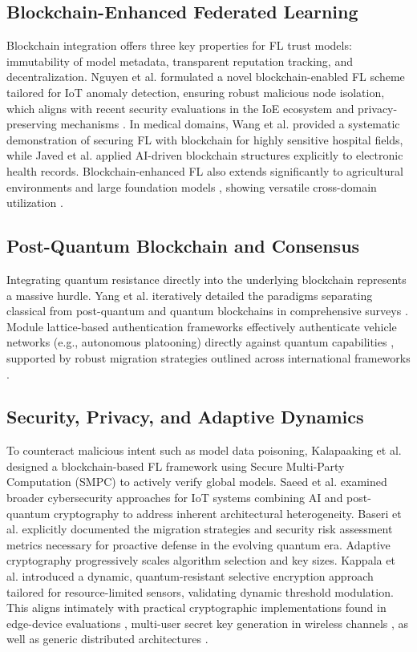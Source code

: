 \documentclass[journal, 10pt, twocolumn]{IEEEtran}
\begin{document}
\subsection{Blockchain-Enhanced Federated Learning}
Blockchain integration offers three key properties for FL trust models: immutability of model metadata, transparent reputation tracking, and decentralization. Nguyen et al. \cite{nguyen2025} formulated a novel blockchain-enabled FL scheme tailored for IoT anomaly detection, ensuring robust malicious node isolation, which aligns with recent security evaluations in the IoE ecosystem \cite{eren2025} and privacy-preserving mechanisms \cite{sameera2024, moore2024}. In medical domains, Wang et al. \cite{wang2026} provided a systematic demonstration of securing FL with blockchain for highly sensitive hospital fields, while Javed et al. \cite{javed2025} applied AI-driven blockchain structures explicitly to electronic health records. Blockchain-enhanced FL also extends significantly to agricultural environments \cite{marzougui2025} and large foundation models \cite{rong2025}, showing versatile cross-domain utilization \cite{anon_crdownload}.

\subsection{Post-Quantum Blockchain and Consensus}
Integrating quantum resistance directly into the underlying blockchain represents a massive hurdle. Yang et al. iteratively detailed the paradigms separating classical from post-quantum and quantum blockchains in comprehensive surveys \cite{yang2024_survey1, yang2024_survey2}. Module lattice-based authentication frameworks effectively authenticate vehicle networks (e.g., autonomous platooning) directly against quantum capabilities \cite{chaudhary2024}, supported by robust migration strategies outlined across international frameworks \cite{elbizri2026}.

\subsection{Security, Privacy, and Adaptive Dynamics}
To counteract malicious intent such as model data poisoning, Kalapaaking et al. \cite{kalapaaking2023} designed a blockchain-based FL framework using Secure Multi-Party Computation (SMPC) to actively verify global models. Saeed et al. \cite{saeed2024} examined broader cybersecurity approaches for IoT systems combining AI and post-quantum cryptography to address inherent architectural heterogeneity. Baseri et al. \cite{baseri2025} explicitly documented the migration strategies and security risk assessment metrics necessary for proactive defense in the evolving quantum era. Adaptive cryptography progressively scales algorithm selection and key sizes. Kappala et al. \cite{kappala2026} introduced a dynamic, quantum-resistant selective encryption approach tailored for resource-limited sensors, validating dynamic threshold modulation. This aligns intimately with practical cryptographic implementations found in edge-device evaluations \cite{lopez2025}, multi-user secret key generation in wireless channels \cite{aygul2025}, as well as generic distributed architectures \cite{nezhadsistani2025}. 
\end{document}
